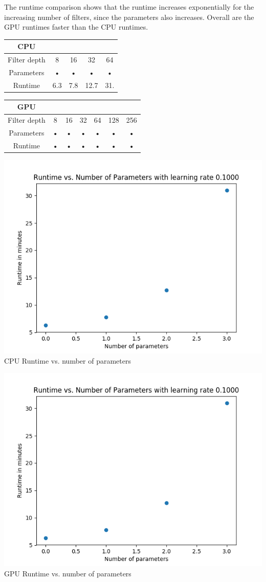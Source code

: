 \documentclass[paper=a4, fontsize=11pt]{scrartcl} %
\numberwithin{equation}{section} %
\numberwithin{figure}{section} %
\numberwithin{table}{section} %
\begin{document}
The runtime comparison shows that the runtime increases exponentially for the increasing number of filters, since the parameters also increases.
Overall are the GPU runtimes faster than the CPU runtimes.\\


\begin{tabular}{|c|c|c|c|c|}
\hline 
\textbf{CPU} &  &  & &    \\ 
\hline 
\hline
Filter depth & 8 & 16 & 32 & 64   \\ 
\hline 
Parameters & • & • & • & •   \\ 
\hline 
Runtime & 6.3 & 7.8 & 12.7 & 31.   \\ 
\hline
\end{tabular} 
\hfill
\begin{tabular}{|c|c|c|c|c|c|c|}
\hline
\textbf{GPU} &  &  &  &  &  &  \\ 
\hline 
\hline
Filter depth & 8 & 16 & 32 & 64 & 128 & 256 \\ 
\hline 
Parameters & • & • & • & • & • & • \\ 
\hline 
Runtime & • & • & • & • & • & • \\ 
\hline 
\end{tabular} 
\begin{minipage}[t]{0.45\textwidth}
	\includegraphics[scale=.5]{runtime_cpu}
	CPU Runtime vs. number of parameters
\end{minipage}
\hfill
\begin{minipage}[t]{0.45\textwidth}
	\includegraphics[scale=.5]{runtime_cpu}
	GPU Runtime vs. number of parameters

\end{minipage}
\end{document}
